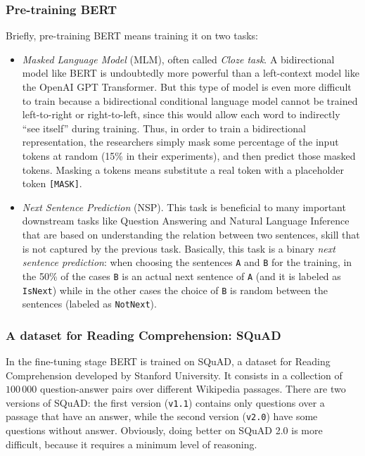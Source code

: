 \subsubsection{Pre-training BERT}
Briefly, pre-training BERT means training it on two tasks:
\begin{itemize}
  \item \textit{Masked Language Model} (MLM), often called \textit{Cloze task}. A bidirectional model like BERT is undoubtedly more powerful than a left-context model like the OpenAI GPT Transformer. But this type of model is even more difficult to train because a bidirectional conditional language model cannot be trained left-to-right or right-to-left, since this would allow each word to indirectly “see itself” during training. Thus, in order to train a bidirectional representation, the researchers simply mask some percentage of the input tokens at random (15\% in their experiments), and then predict those masked tokens. Masking a tokens means substitute a real token with a placeholder token \texttt{[MASK]}. 
  \item \textit{Next Sentence Prediction} (NSP). This task is beneficial to many important downstream tasks like Question Answering and Natural Language Inference that are based on understanding the relation between two sentences, skill that is not captured by the previous task. Basically, this task is a binary \textit{next sentence prediction}: when choosing the sentences \texttt{A} and \texttt{B} for the training, in the 50\% of the cases \texttt{B} is an actual next sentence of \texttt{A} (and it is labeled as \texttt{IsNext}) while in the other cases the choice of \texttt{B} is random between the sentences (labeled as \texttt{NotNext}).
\end{itemize}

\subsubsection{A dataset for Reading Comprehension: SQuAD}
In the fine-tuning stage BERT is trained on SQuAD, a dataset for Reading Comprehension developed by Stanford University. It consists in a collection of $100\,000$ question-answer pairs over different Wikipedia passages. There are two versions of SQuAD: the first version (\texttt{v1.1}) contains only questions over a passage that have an answer, while the second version (\texttt{v2.0}) have some questions without answer. Obviously, doing better on SQuAD 2.0 is more difficult, because it requires a minimum level of reasoning.

